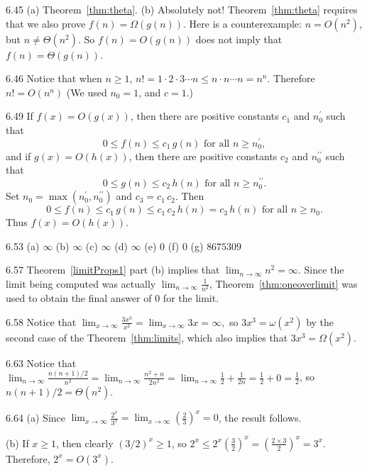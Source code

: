 \begin{Answer}{6.45}
(a) Theorem~\ref{thm:theta}.
(b) Absolutely not!  Theorem~\ref{thm:theta} requires that we also prove
$f(n)=\Omega(g(n))$.  Here is a counterexample: $n=O(n^2)$, but $n\neq\Theta(n^2)$.
So $f(n)=O(g(n))$ does not imply that $f(n)=\Theta(g(n))$.
\end{Answer}
\begin{Answer}{6.46}
Notice that when $n\geq 1$,
$n!=1\cdot 2\cdot 3\cdots n \leq n\cdot n\cdots n = n^n.$
Therefore $n!=O(n^n)$ (We used $n_0=1$, and $c=1$.)
\end{Answer}
\begin{Answer}{6.49}
If $f(x)=O(g(x))$,
then there are positive constants $c_1$ and $n_{0}^{\prime}$
such that
$$0\leq f(n)\leq c_1\,g(n)\mbox{ for all }n \ge n_{0}^{\prime},$$
and if $g(x)=O(h(x))$,
then there are positive constants $c_2$ and
$n_{0}^{\prime\prime}$ such that
$$0\leq g(n)\leq c_2\,h(n)\mbox{ for all }n \ge n_{0}^{\prime\prime}.$$
Set $n_0=\max(n_0^{\prime},n_0^{\prime\prime})$ and $c_3=c_1\,c_2$.
Then
$$0\leq f(n)\leq c_1\,g(n)\leq c_1\,c_2\,h(n)=c_3\,h(n)
\mbox{ for all }n \ge n_{0}.$$
Thus $f(x)=O(h(x))$.
\end{Answer}
\begin{Answer}{6.53}
(a) $\infty$
(b) $\infty$
(c) $\infty$
(d) $\infty$
(e) $0$
(f) $0$
(g) $8675309$
\end{Answer}
\begin{Answer}{6.57}
Theorem~\ref{limitProps1} part (b) implies that
$\displaystyle\lim_{n\rightarrow\infty} n^2=\infty$.
Since the limit being computed was actually
$\displaystyle \lim_{n\rightarrow\infty}\frac{1}{n^2}$,
Theorem~\ref{thm:oneoverlimit}
was used to obtain the final answer of $0$ for the limit.
\end{Answer}
\begin{Answer}{6.58}
Notice that $\lim_{x\rightarrow\infty}\frac{3x^3}{x^2}=
\lim_{x\rightarrow\infty}3x=\infty,$
so $3x^3=\omega(x^2)$ by the second case of the Theorem~\ref{thm:limits}, which also implies
that $3x^3=\Omega(x^2)$.
\end{Answer}
\begin{Answer}{6.63}
Notice that
${\displaystyle \lim_{n\rightarrow\infty}\frac{n(n+1)/2}{n^2} =
\lim_{n\rightarrow\infty}\frac{n^2+n}{2n^2} =
\lim_{n\rightarrow\infty}\frac{1}{2} +\frac{1}{2n}= \frac{1}{2}+0=\frac{1}{2}}$,
so $n(n+1)/2=\Theta(n^2)$.
\end{Answer}
\begin{Answer}{6.64}
(a)
Since
${\displaystyle \lim_{x\rightarrow\infty} \frac{2^x}{ 3^x}
= \lim_{x\rightarrow\infty} \left(\frac{2}{ 3}\right)^x
= 0}$, the result follows.

(b)
If $x\geq 1$, then clearly $(3/2)^x\geq 1$, so
$2^x\leq
2^x\left(\frac{3}{ 2}\right)^x=
\left(\frac{2\times 3}{ 2}\right)^x=3^x.$
Therefore, $2^x=O(3^x)$.
\end{Answer}
